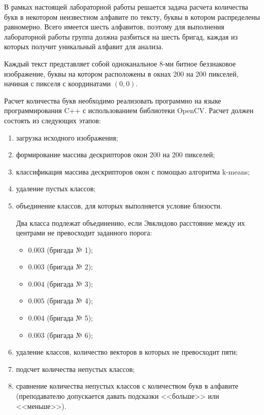 
В рамках настоящей лабораторной работы решается задача расчета количества букв в некотором неизвестном алфавите по тексту, буквы в котором распределены равномерно. Всего имеется шесть алфавитов, поэтому для выполнения лабораторной работы группа должна разбиться на шесть бригад, каждая из которых получит уникальный алфавит для анализа.

Каждый текст представляет собой одноканальное 8-ми битное беззнаковое изображение, буквы на котором расположены в окнах 200 на 200 пикселей, начиная с пикселя с координатами $(0, 0)$.

Расчет количества букв необходимо реализовать программно на языке программирования C++ с использованием библиотеки OpenCV. Расчет должен состоять из следующих этапов:

\begin{enumerate}

	\item загрузка исходного изображения;
	\item формирование массива дескрипторов окон 200 на 200 пикселей;
	\item классификация массива дескрипторов окон с помощью алгоритма k-means;
	\item удаление пустых классов;
	\item объединение классов, для которых выполняется условие близости.

	Два класса подлежат объединению, если Эвклидово расстояние между их центрами не превосходит заданного порога:

	\begin{itemize}

		\item $0.003$ (бригада № 1);
		\item $0.003$ (бригада № 2);
		\item $0.004$ (бригада № 3);
		\item $0.005$ (бригада № 4);
		\item $0.004$ (бригада № 5);
		\item $0.003$ (бригада № 6);

	\end{itemize}

	\item удаление классов, количество векторов в которых не превосходит пяти;
	\item подсчет количества непустых классов;
	\item сравнение количества непустых классов с количеством букв в алфавите (преподавателю допускается давать подсказки <<больше>> или <<меньше>>).

\end{enumerate}

